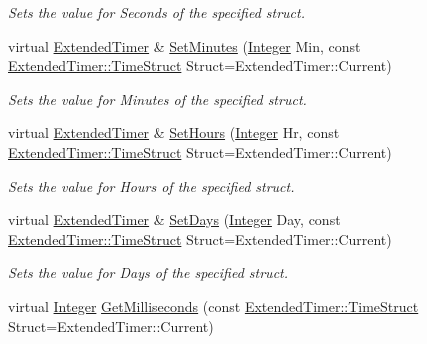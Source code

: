 \begin{DoxyCompactItemize}
\begin{DoxyCompactList}\small\item\em Sets the value for Seconds of the specified struct. \item\end{DoxyCompactList}\item 
virtual \hyperlink{classphys_1_1ExtendedTimer}{ExtendedTimer} \& \hyperlink{classphys_1_1ExtendedTimer_a780114f83344b2cd15a558f054b4e8e8}{SetMinutes} (\hyperlink{namespacephys_a7f09bf5585b2bb97613cd9aad4273a81}{Integer} Min, const \hyperlink{classphys_1_1ExtendedTimer_a0f316e9347d1c118a157cc3c737c554b}{ExtendedTimer::TimeStruct} Struct=ExtendedTimer::Current)
\begin{DoxyCompactList}\small\item\em Sets the value for Minutes of the specified struct. \item\end{DoxyCompactList}\item 
virtual \hyperlink{classphys_1_1ExtendedTimer}{ExtendedTimer} \& \hyperlink{classphys_1_1ExtendedTimer_a33f3d02bdf07073dc4fdf979dd3f68bc}{SetHours} (\hyperlink{namespacephys_a7f09bf5585b2bb97613cd9aad4273a81}{Integer} Hr, const \hyperlink{classphys_1_1ExtendedTimer_a0f316e9347d1c118a157cc3c737c554b}{ExtendedTimer::TimeStruct} Struct=ExtendedTimer::Current)
\begin{DoxyCompactList}\small\item\em Sets the value for Hours of the specified struct. \item\end{DoxyCompactList}\item 
virtual \hyperlink{classphys_1_1ExtendedTimer}{ExtendedTimer} \& \hyperlink{classphys_1_1ExtendedTimer_a3aeeb90ac4e4b20a59b29fc1ee738141}{SetDays} (\hyperlink{namespacephys_a7f09bf5585b2bb97613cd9aad4273a81}{Integer} Day, const \hyperlink{classphys_1_1ExtendedTimer_a0f316e9347d1c118a157cc3c737c554b}{ExtendedTimer::TimeStruct} Struct=ExtendedTimer::Current)
\begin{DoxyCompactList}\small\item\em Sets the value for Days of the specified struct. \item\end{DoxyCompactList}\item 
virtual \hyperlink{namespacephys_a7f09bf5585b2bb97613cd9aad4273a81}{Integer} \hyperlink{classphys_1_1ExtendedTimer_a91e0b11c0e77c7eea5152efb5bed9453}{GetMilliseconds} (const \hyperlink{classphys_1_1ExtendedTimer_a0f316e9347d1c118a157cc3c737c554b}{ExtendedTimer::TimeStruct} Struct=ExtendedTimer::Current)

\end{DoxyCompactItemize}
